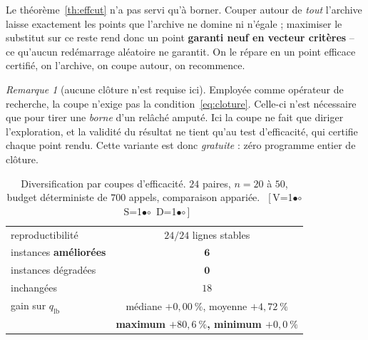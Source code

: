 \documentclass[11pt,a4paper]{article}
\theoremstyle{plain}
\theoremstyle{remark}
\newtheorem{remark}{Remarque}
\newcommand{\cfgm}[1]{\ifnum#1=1$\bullet$\else$\circ$\fi}
\newcommand{\conf}[3]{%
  \textsf{\footnotesize[\,V\cfgm{#1}\ S\cfgm{#2}\ D\cfgm{#3}\,]}}
\begin{document}
Le théorème~\ref{th:effcut} n'a pas servi qu'à borner. Couper autour de
\emph{tout} l'archive laisse exactement les points que l'archive ne domine
ni n'égale ; maximiser le substitut sur ce reste rend donc un point
\textbf{garanti neuf en vecteur critères} -- ce qu'aucun redémarrage
aléatoire ne garantit. On le répare en un point efficace certifié, on
l'archive, on coupe autour, on recommence.

\begin{remark}[aucune clôture n'est requise ici]
Employée comme opérateur de recherche, la coupe n'exige pas la
condition~\eqref{eq:cloture}. Celle-ci n'est nécessaire que pour tirer une
\emph{borne} d'un relâché amputé. Ici la coupe ne fait que diriger
l'exploration, et la validité du résultat ne tient qu'au test d'efficacité,
qui certifie chaque point rendu. Cette variante est donc \emph{gratuite} :
zéro programme entier de clôture.
\end{remark}

\begin{table}[H]
\centering
\caption{Diversification par coupes d'efficacité. $24$ paires,
$n=20$ à $50$, budget déterministe de $700$ appels, comparaison appariée.\ \conf{0}{0}{0}}
\label{tab:divers}
\begin{tabular}{lc}
\toprule
reproductibilité & $24/24$ lignes stables\\
instances \textbf{améliorées} & $\mathbf{6}$\\
instances dégradées & $\mathbf{0}$\\
inchangées & $18$\\
gain sur $q_{\text{lb}}$ & médiane $+0{,}00\ \%$, moyenne $+4{,}72\ \%$\\
                         & \textbf{maximum $+80{,}6\ \%$, minimum $+0{,}0\ \%$}\\
\bottomrule
\end{tabular}
\end{table}
\end{document}
